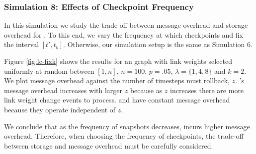 \subsubsection{Simulation 8:  Effects of Checkpoint Frequency}

In this simulation we study the trade-off between message overhead and storage overhead for \cprs. To this end, we vary the frequency at which \cpr checkpoints and fix 
the interval $[t',t_b]$. Otherwise, our simulation setup is the same as Simulation 6.

Figure \ref{fig:lc-fixk} shows the results for an \er graph with link weights selected uniformly at random between $[1,n]$,
$n=100$, $p=.05$, $\lambda=\{1,4,8\}$ and $k=2$. We plot message overhead against the number of timesteps \cpr must rollback, $z$. \cprs's message overhead increases with larger $z$ 
because as $z$ increases there are more link weight change events to process. \second and \purge have constant message overhead because they operate independent of $z$.

We conclude that as the frequency of \cpr snapshots decreases, \cpr incurs higher message overhead.  Therefore, when choosing the frequency of checkpoints,
the trade-off between storage and message overhead must be carefully considered. 



